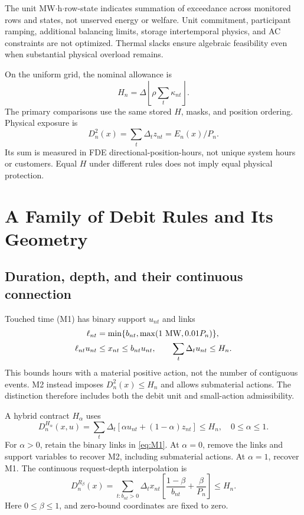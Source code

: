 \documentclass[10pt,journal]{IEEEtran}
\begin{document}
The unit MW$\cdot$h$\cdot$row-state indicates summation of exceedance across monitored rows and states, not unserved energy or welfare. Unit commitment, participant ramping, additional balancing limits, storage intertemporal physics, and AC constraints are not optimized. Thermal slacks ensure algebraic feasibility even when substantial physical overload remains.

On the uniform grid, the nominal allowance is
\begin{equation}
H_n=\Delta\left\lfloor\rho\sum_t\kappa_{nt}\right\rfloor.
\label{eq:H}
\end{equation}
The primary comparisons use the same stored $H$, masks, and position ordering. Physical exposure is
\begin{equation}
D_n^2(x)=\sum_t\Delta_tz_{nt}=E_n(x)/P_n.
\label{eq:FDE}
\end{equation}
Its sum is measured in FDE directional-position-hours, not unique system hours or customers. Equal $H$ under different rules does not imply equal physical protection.

\section{A Family of Debit Rules and Its Geometry}
\label{sec:family}
\subsection{Duration, depth, and their continuous connection}
Touched time (M1) has binary support $u_{nt}$ and links
\begin{align}
\ell_{nt}&=\min\{b_{nt},\max(1\text{ MW},0.01P_n)\},\notag\\
\ell_{nt}u_{nt}&\leq x_{nt}\leq b_{nt}u_{nt},\qquad
\sum_t\Delta_tu_{nt}\leq H_n.
\label{eq:M1}
\end{align}
This bounds hours with a material positive action, not the number of contiguous events. M2 instead imposes $D_n^2(x)\leq H_n$ and allows submaterial actions. The distinction therefore includes both the debit unit and small-action admissibility.

A hybrid contract $H_\alpha$ uses
\begin{equation}
D_n^{H_\alpha}(x,u)=\sum_t\Delta_t[\alpha u_{nt}+(1-\alpha)z_{nt}]
\leq H_n,\quad 0\leq\alpha\leq1.
\label{eq:hybrid}
\end{equation}
For $\alpha>0$, retain the binary links in \eqref{eq:M1}. At $\alpha=0$, remove the links and support variables to recover M2, including submaterial actions. At $\alpha=1$, recover M1. The continuous request-depth interpolation is
\begin{equation}
D_n^{R_\beta}(x)=\sum_{t:b_{nt}>0}\Delta_tx_{nt}
\left[\frac{1-\beta}{b_{nt}}+\frac{\beta}{P_n}\right]\leq H_n.
\label{eq:request}
\end{equation}
Here $0\leq\beta\leq1$, and zero-bound coordinates are fixed to zero.
\end{document}
